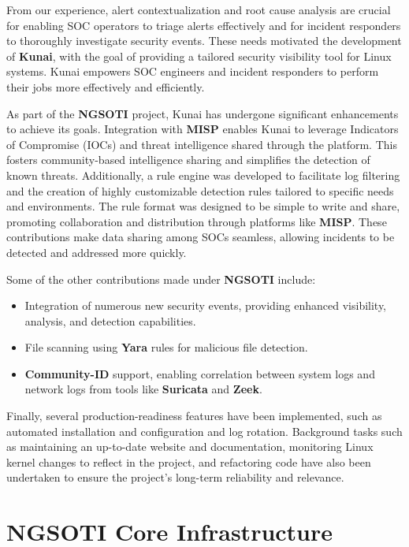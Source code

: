 From our experience, alert contextualization and root cause analysis are
crucial for enabling SOC operators to triage alerts effectively and for
incident responders to thoroughly investigate security events. These needs
motivated the development of \textbf{Kunai}, with the goal of providing a
tailored security visibility tool for Linux systems. Kunai empowers SOC
engineers and incident responders to perform their jobs more effectively and
efficiently.

As part of the \textbf{NGSOTI} project, Kunai has undergone significant
enhancements to achieve its goals. Integration with
\textbf{MISP}\cite{misp_project}
enables Kunai to leverage Indicators of Compromise (IOCs) and threat intelligence
shared through the platform. This fosters community-based intelligence sharing
and simplifies the detection of known threats. Additionally, a rule engine was
developed to facilitate log filtering and the creation of highly customizable
detection rules tailored to specific needs and environments. The rule format was
designed to be simple to write and share, promoting collaboration and distribution
through platforms like \textbf{MISP}. These contributions make data sharing
among SOCs seamless, allowing incidents to be detected and addressed more quickly.

Some of the other contributions made under \textbf{NGSOTI} include:
\begin{itemize}
	\item Integration of numerous new security events, providing enhanced
visibility, analysis, and detection capabilities.
	\item File scanning using
\textbf{Yara}\cite{yara_x} rules for malicious file detection.
	\item \textbf{Community-ID}\cite{community_id_spec}
support, enabling correlation between system logs and network logs from tools
like \textbf{Suricata}\cite{suricata_website}
and \textbf{Zeek}\cite{zeek_website}.
\end{itemize}

Finally, several production-readiness features have been implemented, such as
automated installation and configuration and log rotation. Background tasks
such as maintaining an up-to-date website and documentation\cite{kunai_why},
monitoring Linux kernel changes to reflect in the project, and refactoring
code have also been undertaken to ensure the project's long-term reliability
and relevance.


\section{NGSOTI Core Infrastructure}

